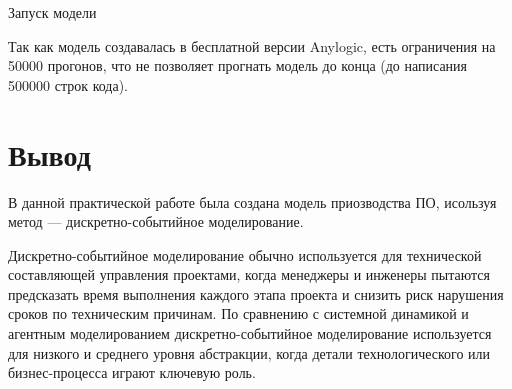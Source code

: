 \begin{image}
	\caption{Запуск модели}
	\label{fig:model:res}
\end{image}

Так как модель создавалась в бесплатной версии Anylogic, есть
ограничения на 50000 прогонов, что не позволяет прогнать модель до конца
(до написания 500000 строк кода).

\clearpage

\section*{\LARGE Вывод}
В данной практической работе была создана модель приозводства ПО,
исользуя метод --- дискретно-событийное моделирование.\par
Дискретно-событийное моделирование обычно используется для
технической составляющей управления проектами, когда менеджеры и
инженеры пытаются предсказать время
выполнения каждого этапа проекта и снизить риск
нарушения сроков по техническим причинам. По
сравнению с системной динамикой и агентным
моделированием дискретно-событийное
моделирование используется для низкого и
среднего уровня абстракции, когда детали
технологического или бизнес-процесса играют
ключевую роль.

